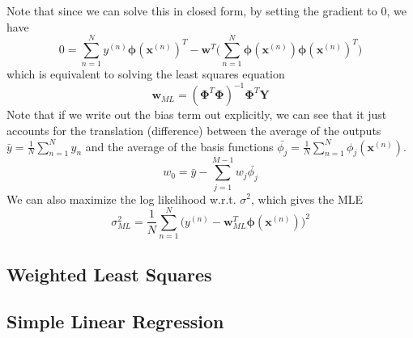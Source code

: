 \documentclass{article}
\begin{document}
    Note that since we can solve this in closed form, by setting the gradient to $0$, we have 
    \[0 = \sum_{n=1}^N y^{(n)} \boldsymbol{\phi}(\mathbf{x}^{(n)})^T - \mathbf{w}^T \bigg( \sum_{n=1}^N \boldsymbol{\phi}(\mathbf{x}^{(n)}) \boldsymbol{\phi}(\mathbf{x}^{(n)})^T \bigg)\]
    which is equivalent to solving the least squares equation 
    \[\mathbf{w}_{ML} = ( \boldsymbol{\Phi}^T \boldsymbol{\Phi})^{-1} \boldsymbol{\Phi}^T \mathbf{Y}\]
    Note that if we write out the bias term out explicitly, we can see that it just accounts for the translation (difference) between the average of the outputs $\bar{y} = \frac{1}{N} \sum_{n=1}^N y_n$ and the average of the basis functions $\bar{\phi_j} = \frac{1}{N} \sum_{n=1}^N \phi_j (\mathbf{x}^{(n)})$. 
    \[w_0 = \bar{y} - \sum_{j=1}^{M-1} w_j \bar{\phi_j}\]
    We can also maximize the log likelihood w.r.t. $\sigma^2$, which gives the MLE 
    \[\sigma^2_{ML} = \frac{1}{N} \sum_{n=1}^N \big( y^{(n)} - \mathbf{w}^T_{ML} \boldsymbol{\phi}(\mathbf{x}^{(n)}) \big)^2\]

  \subsection{Weighted Least Squares}


  \subsection{Simple Linear Regression}
\end{document}
